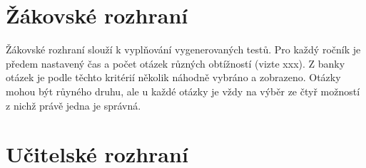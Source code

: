 \section{Žákovské rozhraní}

Žákovské rozhraní slouží k vyplňování vygenerovaných testů. Pro každý ročník je předem nastavený čas a počet otázek různých obtížností (vizte xxx). Z banky otázek je podle těchto kritérií několik náhodně vybráno a zobrazeno. Otázky mohou být růyného druhu, ale u každé otázky je vždy na výběr ze čtyř možností z nichž právě jedna je správná. 

\section{Učitelské rozhraní}
